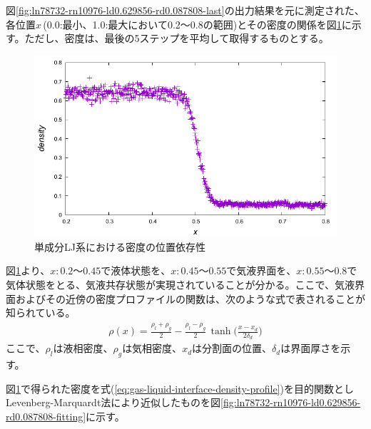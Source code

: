 \documentclass[titlepage]{jsreport}
\begin{document}
図\ref{fig:ln78732-rn10976-ld0.629856-rd0.087808-last}の出力結果を元に測定された、各位置$x$\,(0.0:最小、1.0:最大において0.2〜0.8の範囲)とその密度の関係を図\ref{fig:ln78732-rn10976-ld0.629856-rd0.087808}に示す。ただし、密度は、最後の5ステップを平均して取得するものとする。

\begin{figure}[htbp]
    \begin{center}
        \includegraphics[width=14cm]{fig/ln78732-rn10976-ld0.629856-rd0.087808/ln78732-rn10976-ld0.629856-rd0.087808.pdf}
    \end{center}
    \caption{単成分LJ系における密度の位置依存性}
    \label{fig:ln78732-rn10976-ld0.629856-rd0.087808}
\end{figure}

図\ref{fig:ln78732-rn10976-ld0.629856-rd0.087808}より、$x:0.2〜0.45$で液体状態を、$x:0.45〜0.55$で気液界面を、$x:0.55〜0.8$で気体状態をとる、気液共存状態が実現されていることが分かる。ここで、気液界面およびその近傍の密度プロファイルの関数は、次のような式で表されることが知られている\cite{gas-liquid-interface-density-profile}。
\large
\begin{eqnarray}
    \rho(x) = \frac{\rho_l+\rho_g}{2} - \frac{\rho_l-\rho_g}{2}\,\tanh\Bigg(\frac{x-x_d}{2\delta_d}\Bigg) \label{eq:gas-liquid-interface-density-profile}
\end{eqnarray}
\normalsize
ここで、$\rho_l$は液相密度、$\rho_g$は気相密度、$x_d$は分割面の位置、$\delta_d$は界面厚さを示す。

図\ref{fig:ln78732-rn10976-ld0.629856-rd0.087808}で得られた密度を式(\ref{eq:gas-liquid-interface-density-profile})を目的関数としLevenberg-Marquardt法により近似したものを図\ref{fig:ln78732-rn10976-ld0.629856-rd0.087808-fitting}に示す。
\end{document}
